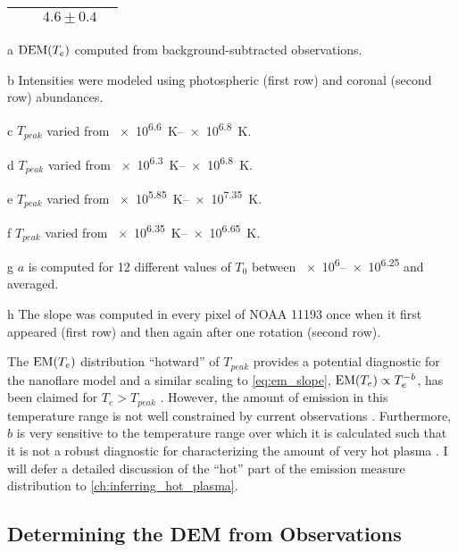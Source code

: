 \begin{table}[!h]
\begin{threeparttable}
\begin{tabularx}{\columnwidth}{lcCC}
        & & $4.6\pm0.4$ & \\
        \bottomrule
    \end{tabularx}
    \begin{tablenotes}
        \footnotesize
        \item[a] $\textup{DEM}(T_e)$ computed from background-subtracted observations.
        \item[b] Intensities were modeled using photospheric (first row) and coronal (second row) abundances.
        \item[c] $T_{peak}$ varied from \SIrange{e6.6}{e6.8}{\kelvin}.
        \item[d] $T_{peak}$ varied from \SIrange{e6.3}{e6.8}{\kelvin}.
        \item[e] $T_{peak}$ varied from \SIrange{e5.85}{e7.35}{\kelvin}.
        \item[f] $T_{peak}$ varied from \SIrange{e6.35}{e6.65}{\kelvin}.
        \item[g] $a$ is computed for 12 different values of $T_0$ between \numrange[range-phrase = and]{e6}{e6.25} and averaged.
        \item[h] The slope was computed in every pixel of \AR{} NOAA 11193 once when it first appeared (first row) and then again after one rotation (second row). 
    \end{tablenotes}
\end{threeparttable}
\end{table}

The $\textup{EM}(T_e)$ distribution ``hotward'' of $T_{peak}$ provides a potential diagnostic for the nanoflare model \citep{cargill_implications_1994,cargill_nanoflare_2004} and a similar scaling to \autoref{eq:em_slope}, $\textup{EM}(T_e)\propto T_e^{-b}$, has been claimed for $T_e>T_{peak}$ \citep[e.g.][]{warren_systematic_2012}. However, the amount of emission in this temperature range is not well constrained by current observations \citep{winebarger_defining_2012}. Furthermore, $b$ is very sensitive to the temperature range over which it is calculated such that it is not a robust diagnostic for characterizing the amount of very hot plasma \citep{barnes_inference_2016-1}. I will defer a detailed discussion of the ``hot'' part of the emission measure distribution to \autoref{ch:inferring_hot_plasma}.

\subsection{Determining the DEM from Observations}

